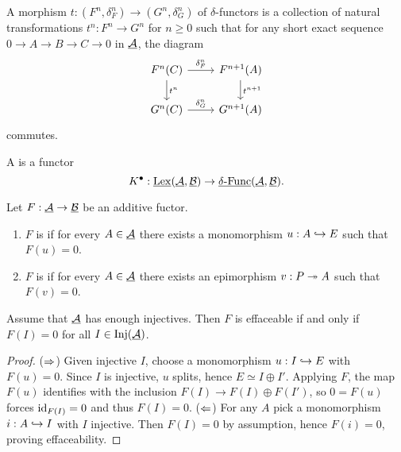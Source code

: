 \begin{definition*}
	A morphism \( t: (F^n, \delta_F^n) \to (G^n, \delta_G^n) \) of \( \delta \)-functors is a collection of natural transformations \( t^n: F^n \to G^n \) for \( n \ge 0 \) such that for any short exact sequence \( 0 \to A \to B \to C \to 0 \) in \( \underline{\mathcal A} \), the diagram
	\[
		\begin{tikzcd}
			F^n(C) \arrow[r,"\delta_F^n"] \arrow[d,"t^n"] & F^{n+1}(A) \arrow[d,"t^{n+1}"] \\
			G^n(C) \arrow[r,"\delta_G^n"] & G^{n+1}(A)
		\end{tikzcd}
	\]
	commutes.
\end{definition*}

\begin{definition*}
	A  is a functor
	\[
		K^\bullet: \underline{\mathrm{Lex}}(\underline{\mathcal A}, \underline{\mathcal B}) \to \underline{\delta\text{-}\mathrm{Func}}(\underline{\mathcal A}, \underline{\mathcal B}).
	\]
\end{definition*}

\begin{definition*}
	Let \( F: \underline{\mathcal A} \to \underline{\mathcal B} \) be an additive fuctor.
	\begin{enumerate}
		\item \( F \) is  if for every \( A \in \underline{\mathcal A} \) there exists a monomorphism \( u: A \hookrightarrow E \) such that \( F(u)=0 \).
		\item \( F \) is  if for every \( A \in \underline{\mathcal A} \) there exists an epimorphism \( v: P \twoheadrightarrow A \) such that \( F(v)=0 \).
	\end{enumerate}
\end{definition*}

\begin{lemma*}
	Assume that \( \underline{\mathcal A} \) has enough injectives. Then \( F \) is effaceable if and only if \( F(I)=0 \) for all \( I \in \operatorname{Inj}(\underline{\mathcal A}) \).
\end{lemma*}

\begin{proof}
	(\( \Rightarrow \)) Given injective \( I \), choose a monomorphism \( u: I \hookrightarrow E \) with \( F(u)=0 \). Since \( I \) is injective, \( u \) splits, hence \( E \simeq I \oplus I' \). Applying \( F \), the map \( F(u) \) identifies with the inclusion \( F(I) \to F(I) \oplus F(I') \), so \( 0 = F(u) \) forces \( \mathrm{id}_{F(I)}=0 \) and thus \( F(I)=0 \).
	(\( \Leftarrow \)) For any \( A \) pick a monomorphism \( i: A \hookrightarrow I \) with \( I \) injective. Then \( F(I)=0 \) by assumption, hence \( F(i)=0 \), proving effaceability.
\end{proof}

